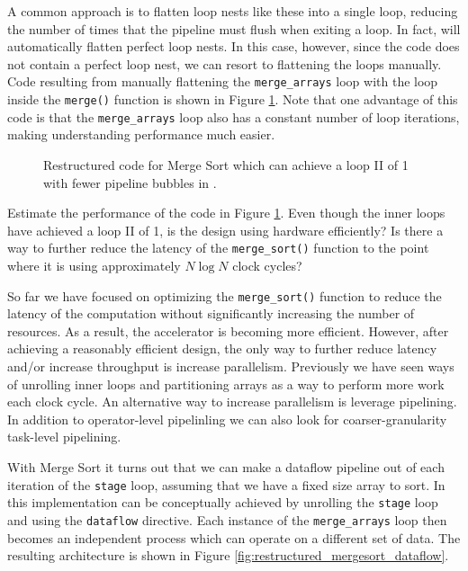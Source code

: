 A common approach is to flatten loop nests like these into a single loop, reducing the number of times that the pipeline must flush when exiting a loop.  In fact, \VHLS will automatically flatten perfect loop nests.  In this case, however, since the code does not contain a perfect loop nest, we can resort to flattening the loops manually.  Code resulting from manually flattening the \lstinline{merge_arrays} loop with the loop inside the \lstinline{merge()} function is shown in Figure \ref{fig:merge_sort_loop_merged.cpp}.  Note that one advantage of this code is that the \lstinline{merge_arrays} loop also has a constant number of loop iterations, making understanding performance much easier.

\begin{figure}
{\tiny }
\caption{Restructured code for Merge Sort which can achieve a loop II of 1 with fewer pipeline bubbles in \VHLS.}
\label{fig:merge_sort_loop_merged.cpp}
\end{figure}

\begin{aside}
Estimate the performance of the code in Figure \ref{fig:merge_sort_loop_merged.cpp}.  Even though the inner loops have achieved a loop II of 1, is the design using hardware efficiently?  Is there a way to further reduce the latency of the \lstinline{merge_sort()} function to the point where it is using approximately $N \log N$ clock cycles?
\end{aside}

So far we have focused on optimizing the \lstinline{merge_sort()} function to reduce the latency of the computation without significantly increasing the number of resources.   As a result, the accelerator is becoming more efficient.  However, after achieving a reasonably efficient design, the only way to further reduce latency and/or increase throughput is increase parallelism.  Previously we have seen ways of unrolling inner loops and partitioning arrays as a way to perform more work each clock cycle.  An alternative way to increase parallelism is leverage pipelining.  In addition to operator-level pipelinling we can also look for coarser-granularity task-level pipelining.

With Merge Sort it turns out that we can make a dataflow pipeline out of each iteration of the \lstinline{stage} loop, assuming that we have a fixed size array to sort.  In \VHLS this implementation can be conceptually achieved by unrolling the \lstinline{stage} loop and using the \lstinline{dataflow} directive.  Each instance of the \lstinline{merge_arrays} loop then becomes an independent process which can operate on a different set of data.  The resulting architecture is shown in Figure \ref{fig:restructured_mergesort_dataflow}.  

